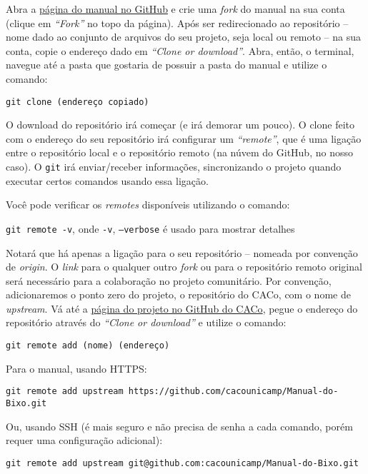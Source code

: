 \documentclass[a4paper,oneside,10pt]{memoir}
\begin{document}
Abra a \href{https://github.com/cacounicamp/Manual-do-Bixo/}{página do manual no
GitHub} e crie uma \emph{fork} do manual na sua conta (clique em \emph{“Fork”}
no topo da página). Após ser redirecionado ao repositório -- nome dado ao
conjunto de arquivos do seu projeto, seja local ou remoto -- na sua conta, copie
o endereço dado em \emph{“Clone or download”}. Abra, então, o terminal, navegue
até a pasta que gostaria de possuir a pasta do manual e utilize o comando:

\begin{center}
\texttt{git clone (endereço copiado)}
\end{center}

O download do repositório irá começar (e irá demorar um pouco). O clone feito
com o endereço do seu repositório irá configurar um \emph{“remote”}, que é uma
ligação entre o repositório local e o repositório remoto (na núvem do GitHub,
no nosso caso). O \texttt{git} irá enviar/receber informações, sincronizando o
projeto quando executar certos comandos usando essa ligação.

Você pode verificar os \emph{remotes} disponíveis utilizando o comando:
\begin{center}
\texttt{git remote -v}, onde \texttt{-v}, \texttt{--verbose} é usado para
mostrar detalhes
\end{center}

Notará que há apenas a ligação para o seu repositório -- nomeada por convenção
de \emph{origin}. O \emph{link} para o qualquer outro \emph{fork} ou para o
repositório remoto original será necessário para a colaboração no projeto
comunitário. Por convenção, adicionaremos o ponto zero do projeto, o repositório
do CACo, com o nome de \emph{upstream}. Vá até a
\href{https://github.com/cacounicamp/Manual-do-Bixo/}{página do projeto no
GitHub do CACo}, pegue o endereço do repositório através do \emph{“Clone or
download”} e utilize o comando:

\begin{center}
\texttt{git remote add (nome) (endereço)}
\end{center}

\noindent Para o manual, usando HTTPS:
\begin{center}
\texttt{git remote add upstream
https://github.com/cacounicamp/Manual-do-Bixo.git}
\end{center}
Ou, usando SSH (é mais seguro e não precisa de senha a cada comando, porém
requer uma configuração adicional):
\begin{center}
\texttt{git remote add upstream git@github.com:cacounicamp/Manual-do-Bixo.git}
\end{center}
\end{document}
